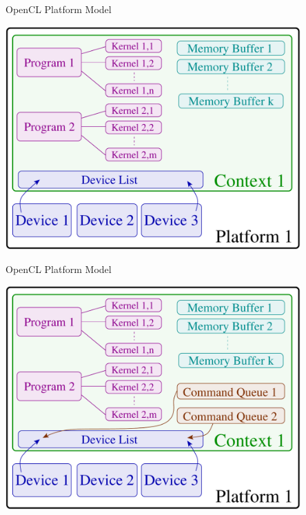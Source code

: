 \begin{frame}{OpenCL Platform Model}
 \begin{center}
   \includegraphics[width=0.85\textwidth]{figs/opencl-8.pdf}
 \end{center}
\end{frame}

\begin{frame}{OpenCL Platform Model}
 \begin{center}
   \includegraphics[width=0.85\textwidth]{figs/opencl-full.pdf}
 \end{center}
\end{frame}




